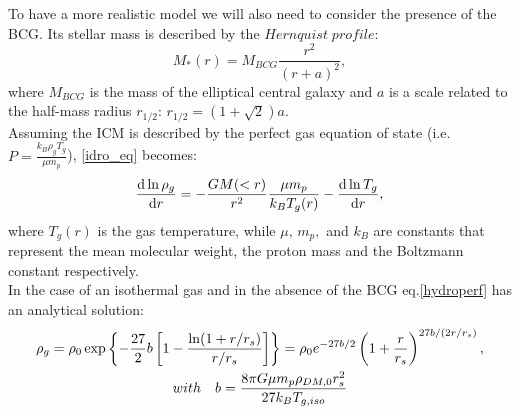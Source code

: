 \documentclass{article}
\begin{document}
To have a more realistic model we will also need to consider the presence of the BCG. Its stellar mass is described by the $Hernquist\; profile$:
\begin{equation}\label{Hern}
	M_{*}(r)=M_{BCG}\frac{r^{2}}{(r+a)^{2}},
\end{equation}
where $M_{BCG}$ is the mass of the elliptical central galaxy and $a$ is a scale related to the half-mass radius $r_{1/2}$: $r_{1/2}=(1+\sqrt{2})a$.\\
Assuming the ICM is described by the perfect gas equation of state (i.e. $P=\frac{k_{B}\rho_{g}T_{g}}{\mu m_{p}}$), \eqref{idro_eq} becomes:
\begin{equation}\label{hydroperf}
	\derivative{\ln \rho_{g}}{r}=-\frac{GM(<r)}{r^{2}}\frac{\mu m_{p}}{k_{B}T_{g}(r)}-\derivative{\ln T_{g}}{r},
\end{equation}
where $T_{g}(r)$ is the gas temperature, while $\mu ,\, m_{p},$ and $k_{B}$ are constants that represent the mean molecular weight, the proton mass and the Boltzmann constant respectively.\\
In the case of an isothermal gas and in the absence of the BCG eq.\eqref{hydroperf} has an analytical solution:
	\begin{gather}\label{isogas}
		\rho_{g}=\rho_{0}\exp\left\{-\frac{27}{2}b\left[1-\frac{\ln (1+r/r_{s})}{r/r_{s}}\right]\right\}=\rho_{0}e^{-27b/2}\left(1+\frac{r}{r_{s}}\right)^{27b/(2r/r_{s})},\\
	with \quad b=\frac{8\pi G\mu m_{p}\rho_{DM,0}r_{s}^{2}}{27k_{B}T_{g,iso}}\notag
	\end{gather}
\end{document}
